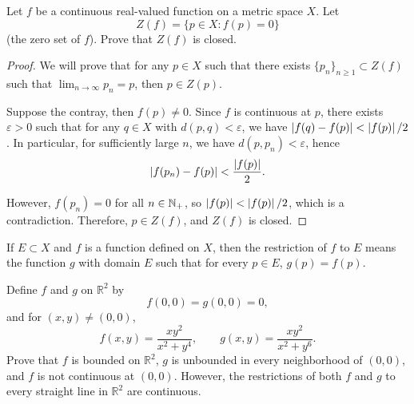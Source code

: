 \documentclass{article}
\begin{document}
\begin{problem}[4-3]
Let $f$ be a continuous real-valued function on a metric space $X$. Let
\[
Z(f)=\{p\in X: f(p)=0\}
\]
(the zero set of $f$). Prove that $Z(f)$ is closed.
\end{problem}

\begin{proof}
  We will prove that for any \( p\in X \) such that there exists \( \{p_n\}_{n\ge 1}\subset Z(f) \) such that \( \lim_{n\to\infty}p_n=p \), then \( p\in Z(p) \).\par
  Suppose the contray, then \( f(p)\ne 0 \). Since \( f \) is continuous at \( p \), there exists \( \varepsilon>0 \) such that for any \( q\in X \) with \( d(p,q)<\varepsilon \), we have \( \left|f(q)-f(p)\right|<\left|f(p)\right|/2 \). In particular, for sufficiently large \( n \), we have \( d(p,p_n)<\varepsilon \), hence
  \[ \left|f(p_n)-f(p)\right|<\frac{\left|f(p)\right|}{2}. \]\par
  However, \( f(p_n)=0 \) for all \( n\in\mathbb{N}_+ \), so \( \left|f(p)\right|<\left|f(p)\right|/2 \), which is a contradiction. Therefore, \( p\in Z(f) \), and \( Z(f) \) is closed.
\end{proof}

\begin{problem}[4-7]
If $E\subset X$ and $f$ is a function defined on $X$, then the restriction of $f$ to $E$ means the function $g$ with domain $E$ such that for every $p\in E$, $g(p)=f(p)$.

Define $f$ and $g$ on $\mathbb{R}^2$ by
\[
f(0,0)=g(0,0)=0,
\]
and for $(x,y)\ne(0,0)$,
\[
f(x,y)=\frac{xy^2}{x^2+y^4},\qquad g(x,y)=\frac{xy^2}{x^2+y^6}.
\]
Prove that $f$ is bounded on $\mathbb{R}^2$, $g$ is unbounded in every neighborhood of $(0,0)$, and $f$ is not continuous at $(0,0)$. However, the restrictions of both $f$ and $g$ to every straight line in $\mathbb{R}^2$ are continuous.
\end{problem}
\end{document}
